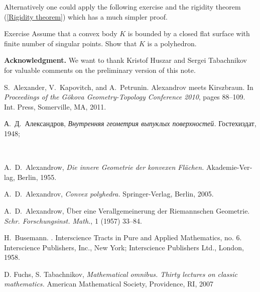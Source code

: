 \documentclass[oneside,a4paper, 12pt]{article}
\begin{document}
Alternatively one could apply the following exercise and the rigidity theorem (\ref{Rigidity theorem}) which has a much simpler proof.
\qeds

\begin{thm}{Exercise}
Assume that a convex body $K$ is bounded by a closed flat surface with finite number of singular points.
Show that $K$ is a polyhedron.
\end{thm}


\bigskip
\textbf{Acknowledgment.}
We want to thank Kristof Huszar and Sergei Tabachnikov for valuable comments on the preliminary version of this note. 




\begin{thebibliography}{52}


S.~Alexander, V.~Kapovitch, and A.~Petrunin.
\newblock Alexandrov meets {K}irszbraun.
\newblock In {\em Proceedings of the {G}\"okova {G}eometry-{T}opology
  {C}onference 2010}, pages 88--109. Int. Press, Somerville, MA, 2011.

\begin{otherlanguage}{russian}
А.~Д.~Александров,
\emph{Внутренняя геометрия выпуклых поверхностей.} 
Гостехиздат, 1948;
\end{otherlanguage}\\
\begin{otherlanguage}{german}
A.~D.~Alexandrow, \emph{Die innere Geometrie der konvexen Fl\"achen.} 
Akademie-Verlag, Berlin, 1955.
\end{otherlanguage}

 A.~D.~Alexandrov, \emph{Convex polyhedra.} Springer-Verlag, Berlin, 2005.

A.~D.~Alexandrow,
\"Uber eine Verallgemeinerung der Riemannschen Geometrie.
\emph{Schr. Forschungsinst. Math.},
1 (1957) 33--84.

H.~Busemann.
.
\newblock Interscience Tracts in Pure and Applied Mathematics, no. 6.
Interscience Publishers, Inc., New York; Interscience Publishers Ltd.,
London, 1958.

 D. Fuchs, S. Tabachnikov,
\emph{Mathematical omnibus. Thirty lectures on classic mathematics.}
American Mathematical Society, Providence, RI, 2007
  

\end{thebibliography}
\end{document}
